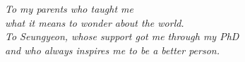 \chapter*{~}


\begin{center}                  %
\vspace*{3in}                   %
    \begin{onehalfspacing}      %
    \textit{
    To my parents  who taught me\\
    what it means to wonder about the world.\\
    \bigskip
    To Seungyeon, whose support got me through my PhD\\
    and who always inspires me to be a better person.\\
    }
\end{onehalfspacing}
\end{center}